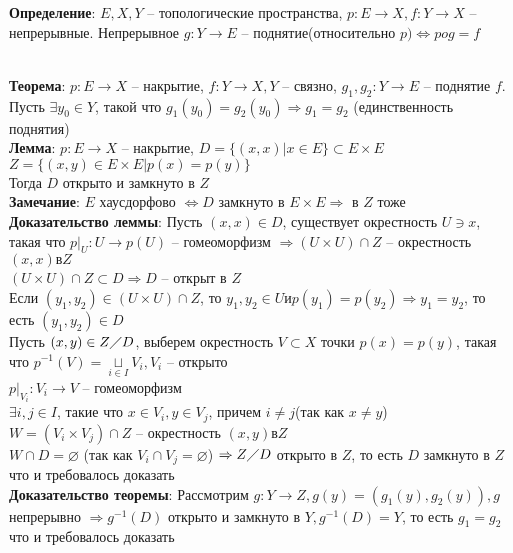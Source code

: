 	\textbf{Определение}: $E, X, Y$ -- топологические пространства, $p: E\rightarrow X, f: Y\rightarrow X$ -- непрерывные. Непрерывное $g: Y\rightarrow E$ -- поднятие(относительно $p) \Leftrightarrow pog = f$\\
	\begin{figure}[h]
	\end{figure}\\
	\textbf{Теорема}: $p: E \rightarrow X$ -- накрытие, $f: Y\rightarrow X, Y$ -- связно, $g_1, g_2: Y \rightarrow E$ -- поднятие $f$. Пусть $\exists y_0 \in Y$, такой что $g_1 (y_0) = g_2 (y_0) \Rightarrow g_1 = g_2$ (единственность поднятия)\\
	\textbf{Лемма}: $p: E \rightarrow X$ -- накрытие, $D = \{ (x,x)|x\in E\} \subset E\times E$\\
	$Z = \{(x,y) \in E\times E | p(x) = p(y)\}$\\
	Тогда $D$ открыто и замкнуто в $Z$\\
	\textbf{Замечание}: $E$ хаусдорфово $\Leftrightarrow D$ замкнуто в $E\times E \Rightarrow$ в $Z$ тоже\\
	\textbf{Доказательство леммы}: Пусть $(x,x)\in D$, существует окрестность $U\ni x$, такая что ${p|}_U: U \rightarrow p(U)$ -- гомеоморфизм $\Rightarrow (U\times U) \cap Z$ -- окрестность $(x,x) в Z$\\
	$(U\times U)\cap Z \subset D \Rightarrow D$ -- открыт в $Z$\\
	Если $(y_1,y_2) \in (U\times U)\cap Z$, то $y_1,y_2 \in U и p(y_1) = p(y_2) \Rightarrow y_1 = y_2$, то есть $(y_1,y_2)\in D$\\
	Пусть $(x,y)\in Z\diagup D$, выберем окрестность $V\subset X$ точки $p(x) = p(y)$, такая что $p^{-1} (V) = \underset{i\in I}{\sqcup} V_i, V_i$ -- открыто\\
	${p|}_{V_i}: V_i \rightarrow V$ -- гомеоморфизм\\
	$\exists i,j \in I$, такие что $x\in V_i, y\in V_j$, причем $i\neq j$(так как $x\neq y$)\\
	$W = (V_i \times V_j) \cap Z$ -- окрестность $(x,y) в Z$\\
	$W \cap D = \varnothing$ (так как $V_i \cap V_j = \varnothing$) $\Rightarrow Z\diagup D$ открыто в $Z$, то есть $D$ замкнуто в $Z$ что и требовалось доказать\\
	\textbf{Доказательство теоремы}: Рассмотрим $g: Y\rightarrow Z, g(y) = (g_1 (y), g_2 (y)), g$ непрерывно $\Rightarrow g^{-1} (D)$ открыто и замкнуто в $Y, g^{-1} (D) = Y$, то есть $g_1 = g_2$ что и требовалось доказать
	


